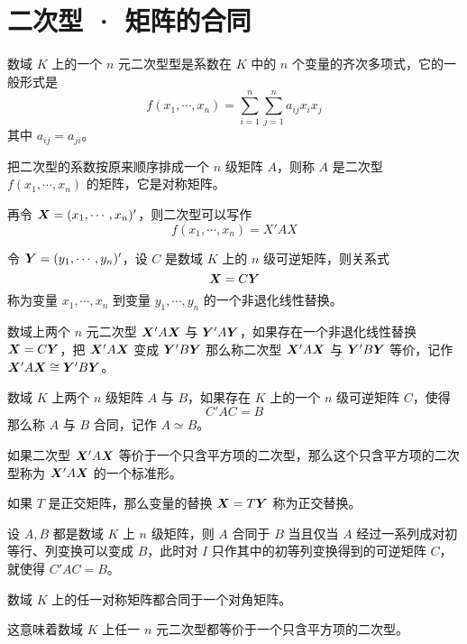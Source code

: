 \chapter{二次型 · 矩阵的合同}

\begin{definition}
    数域 $K$ 上的一个 $n$ 元二次型型是系数在 $K$ 中的 $n$ 个变量的齐次多项式，它的一般形式是
    $$f(x_1,\cdots,x_n) = \sum_{i=1}^n\sum_{j=1}^na_{ij}x_ix_j$$
    其中 $a_{ij} = a_{ji}$。
\end{definition}

把二次型的系数按原来顺序排成一个 $n$ 级矩阵 $A$，则称 $A$ 是二次型 $f(x_1,\cdots,x_n)$ 的矩阵，它是对称矩阵。

再令 $\boldsymbol{X} = (x_1,\cdots,x_n)'$，则二次型可以写作
$$f(x_1,\cdots,x_n) = X'AX$$

令 $\boldsymbol{Y} = (y_1,\cdots,y_n)'$，设 $C$ 是数域 $K$ 上的 $n$ 级可逆矩阵，则关系式
$$\boldsymbol{X} = C\boldsymbol{Y}$$
称为变量 $x_1,\cdots,x_n$ 到变量 $y_1,\cdots,y_n$ 的一个非退化线性替换。

\begin{definition}
    数域上两个 $n$ 元二次型 $\boldsymbol{X}'A\boldsymbol{X}$ 与 $\boldsymbol{Y}'A\boldsymbol{Y}$，如果存在一个非退化线性替换 $\boldsymbol{X} = C\boldsymbol{Y}$，把 $\boldsymbol{X}'A\boldsymbol{X}$ 变成 $\boldsymbol{Y}'B\boldsymbol{Y}$ 那么称二次型 $\boldsymbol{X}'A\boldsymbol{X}$ 与 $\boldsymbol{Y}'B\boldsymbol{Y}$ 等价，记作 $\boldsymbol{X}'A\boldsymbol{X} \cong \boldsymbol{Y}'B\boldsymbol{Y}$。
\end{definition}

\begin{definition}
    数域 $K$ 上两个 $n$ 级矩阵 $A$ 与 $B$，如果存在 $K$ 上的一个 $n$ 级可逆矩阵 $C$，使得
    $$C'AC = B$$
    那么称 $A$ 与 $B$ 合同，记作 $A\simeq B$。
\end{definition}

如果二次型 $\boldsymbol{X}' A \boldsymbol{X}$ 等价于一个只含平方项的二次型，那么这个只含平方项的二次型称为 $\boldsymbol{X}'A\boldsymbol{X}$ 的一个标准形。

如果 $T$ 是正交矩阵，那么变量的替换 $\boldsymbol{X} = T\boldsymbol{Y}$ 称为正交替换。

\begin{theorem}
    设 $A,B$ 都是数域 $K$ 上 $n$ 级矩阵，则 $A$ 合同于 $B$ 当且仅当 $A$ 经过一系列成对初等行、列变换可以变成 $B$，此时对 $I$ 只作其中的初等列变换得到的可逆矩阵 $C$，就使得 $C'AC=B$。
\end{theorem}

\begin{theorem}
    数域 $K$ 上的任一对称矩阵都合同于一个对角矩阵。
\end{theorem}

这意味着数域 $K$ 上任一 $n$ 元二次型都等价于一个只含平方项的二次型。

